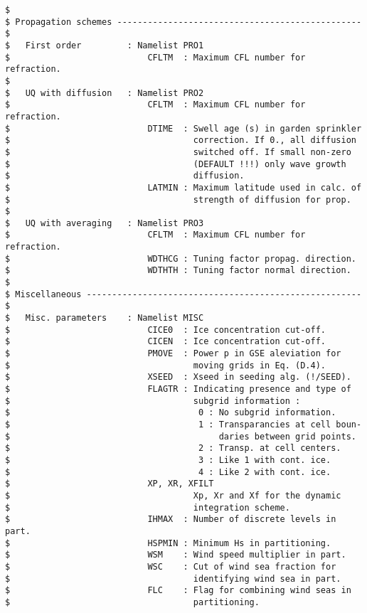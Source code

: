 \begin{verbatim}
$
$ Propagation schemes ------------------------------------------------ $
$   First order         : Namelist PRO1
$                           CFLTM  : Maximum CFL number for refraction.
$
$   UQ with diffusion   : Namelist PRO2
$                           CFLTM  : Maximum CFL number for refraction.
$                           DTIME  : Swell age (s) in garden sprinkler
$                                    correction. If 0., all diffusion
$                                    switched off. If small non-zero
$                                    (DEFAULT !!!) only wave growth
$                                    diffusion.
$                           LATMIN : Maximum latitude used in calc. of
$                                    strength of diffusion for prop.
$
$   UQ with averaging   : Namelist PRO3
$                           CFLTM  : Maximum CFL number for refraction.
$                           WDTHCG : Tuning factor propag. direction.
$                           WDTHTH : Tuning factor normal direction.
$
$ Miscellaneous ------------------------------------------------------ $
$   Misc. parameters    : Namelist MISC
$                           CICE0  : Ice concentration cut-off.
$                           CICEN  : Ice concentration cut-off.
$                           PMOVE  : Power p in GSE aleviation for
$                                    moving grids in Eq. (D.4).
$                           XSEED  : Xseed in seeding alg. (!/SEED).
$                           FLAGTR : Indicating presence and type of
$                                    subgrid information :
$                                     0 : No subgrid information.
$                                     1 : Transparancies at cell boun-
$                                         daries between grid points.
$                                     2 : Transp. at cell centers.
$                                     3 : Like 1 with cont. ice.
$                                     4 : Like 2 with cont. ice.
$                           XP, XR, XFILT
$                                    Xp, Xr and Xf for the dynamic
$                                    integration scheme.
$                           IHMAX  : Number of discrete levels in part.
$                           HSPMIN : Minimum Hs in partitioning.
$                           WSM    : Wind speed multiplier in part.
$                           WSC    : Cut of wind sea fraction for
$                                    identifying wind sea in part.
$                           FLC    : Flag for combining wind seas in
$                                    partitioning.

\end{verbatim}
